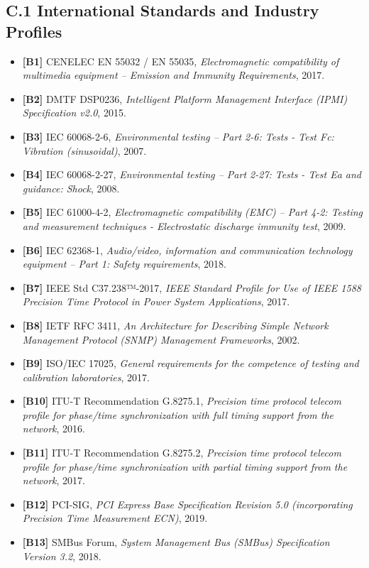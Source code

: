 \documentclass[
]{article}
\begin{document}
\subsection{C.1 International Standards and Industry
Profiles}\label{c.1-international-standards-and-industry-profiles}

\begin{itemize}
\item
  \textbf{{{[}}B1{{]}}} CENELEC EN 55032 / EN 55035,
  \emph{Electromagnetic compatibility of multimedia equipment --
  Emission and Immunity Requirements}, 2017.
\item
  \textbf{{{[}}B2{{]}}} DMTF DSP0236, \emph{Intelligent Platform
  Management Interface (IPMI) Specification v2.0}, 2015.
\item
  \textbf{{{[}}B3{{]}}} IEC 60068-2-6, \emph{Environmental testing --
  Part 2-6: Tests - Test Fc: Vibration (sinusoidal)}, 2007.
\item
  \textbf{{{[}}B4{{]}}} IEC 60068-2-27, \emph{Environmental testing --
  Part 2-27: Tests - Test Ea and guidance: Shock}, 2008.
\item
  \textbf{{{[}}B5{{]}}} IEC 61000-4-2, \emph{Electromagnetic
  compatibility (EMC) -- Part 4-2: Testing and measurement techniques -
  Electrostatic discharge immunity test}, 2009.
\item
  \textbf{{{[}}B6{{]}}} IEC 62368-1, \emph{Audio/video, information and
  communication technology equipment -- Part 1: Safety requirements},
  2018.
\item
  \textbf{{{[}}B7{{]}}} IEEE Std C37.238™-2017, \emph{IEEE Standard
  Profile for Use of IEEE 1588 Precision Time Protocol in Power System
  Applications}, 2017.
\item
  \textbf{{{[}}B8{{]}}} IETF RFC 3411, \emph{An Architecture for
  Describing Simple Network Management Protocol (SNMP) Management
  Frameworks}, 2002.
\item
  \textbf{{{[}}B9{{]}}} ISO/IEC 17025, \emph{General requirements for
  the competence of testing and calibration laboratories}, 2017.
\item
  \textbf{{{[}}B10{{]}}} ITU-T Recommendation G.8275.1, \emph{Precision
  time protocol telecom profile for phase/time synchronization with full
  timing support from the network}, 2016.
\item
  \textbf{{{[}}B11{{]}}} ITU-T Recommendation G.8275.2, \emph{Precision
  time protocol telecom profile for phase/time synchronization with
  partial timing support from the network}, 2017.
\item
  \textbf{{{[}}B12{{]}}} PCI-SIG, \emph{PCI Express Base Specification
  Revision 5.0 (incorporating Precision Time Measurement ECN)}, 2019.
\item
  \textbf{{{[}}B13{{]}}} SMBus Forum, \emph{System Management Bus
  (SMBus) Specification Version 3.2}, 2018.
\end{itemize}
\end{document}
